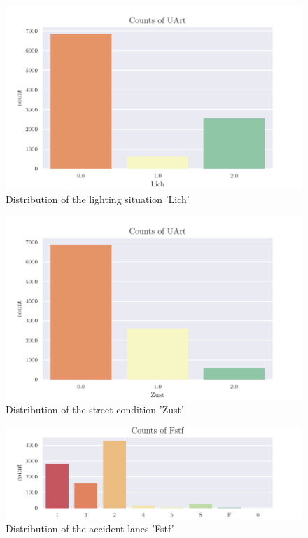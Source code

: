 \documentclass[a4paper,headsepline,footsepline,fontsize=11pt,BCOR=12mm,DIV=12]{report}
\begin{document}
\begin{appendices}
\begin{figure}[h]
	\centering
	\includegraphics[scale=1]{../CorrAnalysis/data/BAYSIS/01_dataset/plots/baysis_dataset_count_Lich}
	\caption{Distribution of the lighting situation 'Lich'}
	\label{img:appendix_baysis_dataset_Lich}
\end{figure}

\begin{figure}[h]
	\centering
	\includegraphics[scale=1]{../CorrAnalysis/data/BAYSIS/01_dataset/plots/baysis_dataset_count_Zust}
	\caption{Distribution of the street condition 'Zust'}
	\label{img:appendix_baysis_dataset_Zust}
\end{figure}

\begin{figure}[h]
	\centering
	\includegraphics[scale=1]{../CorrAnalysis/data/BAYSIS/01_dataset/plots/baysis_dataset_count_Fstf}
	\caption{Distribution of the accident lanes 'Fstf'}
	\label{img:appendix_baysis_dataset_Fstf}
\end{figure}


\end{appendices}
\end{document}
